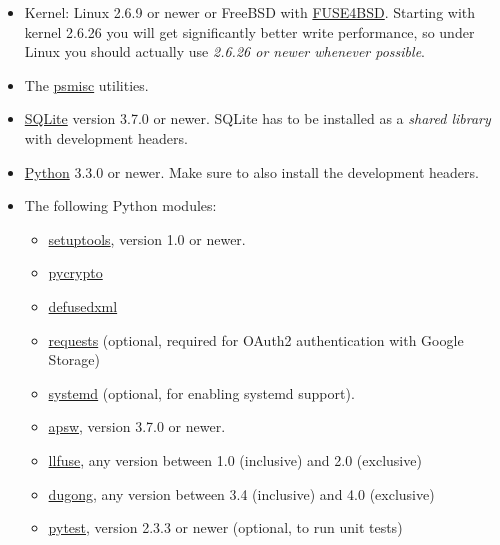 \documentclass[letterpaper,10pt,english]{sphinxmanual}
\begin{document}
\begin{itemize}
\item {} 
Kernel: Linux 2.6.9 or newer or FreeBSD with \href{http://www.freshports.org/sysutils/fusefs-kmod/}{FUSE4BSD}. Starting with
kernel 2.6.26 you will get significantly better write performance,
so under Linux you should actually use \emph{2.6.26 or newer whenever
possible}.

\item {} 
The \href{http://psmisc.sf.net/}{psmisc} utilities.

\item {} 
\href{http://www.sqlite.org/}{SQLite} version 3.7.0 or newer. SQLite
has to be installed as a \emph{shared library} with development headers.

\item {} 
\href{http://www.python.org/}{Python} 3.3.0 or newer. Make sure to also
install the development headers.

\item {} 
The following Python modules:
\begin{itemize}
\item {} 
\href{https://pypi.python.org/pypi/setuptools}{setuptools}, version 1.0 or newer.

\item {} 
\href{https://www.dlitz.net/software/pycrypto/}{pycrypto}

\item {} 
\href{https://pypi.python.org/pypi/defusedxml/}{defusedxml}

\item {} 
\href{https://pypi.python.org/pypi/requests/}{requests} (optional,
required for OAuth2 authentication with Google Storage)

\item {} 
\href{https://github.com/systemd/python-systemd}{systemd} (optional,
for enabling systemd support).

\item {} 
\href{https://github.com/rogerbinns/apsw}{apsw}, version 3.7.0 or
newer.

\item {} 
\href{https://bitbucket.org/nikratio/python-llfuse/}{llfuse}, any
version between 1.0 (inclusive) and 2.0 (exclusive)

\item {} 
\href{https://bitbucket.org/nikratio/python-dugong/}{dugong}, any
version between 3.4 (inclusive) and 4.0 (exclusive)

\item {} 
\href{http://pytest.org/}{pytest}, version 2.3.3 or newer (optional, to run unit tests)


\end{itemize}
\end{itemize}
\end{document}
